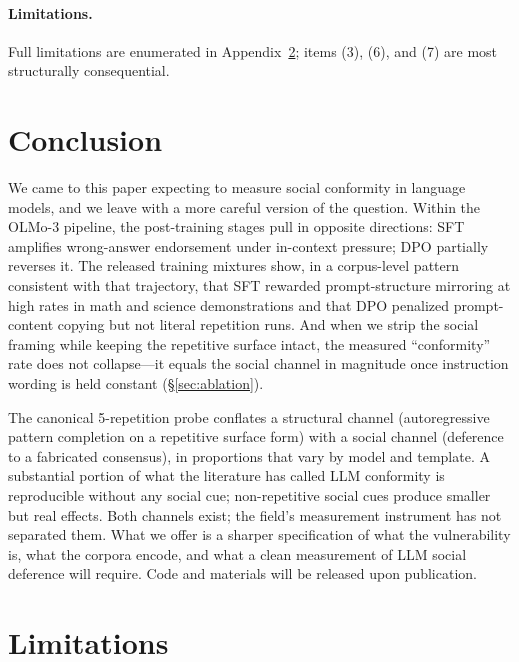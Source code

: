 \documentclass{article}
\begin{document}
\paragraph{Limitations.}
\label{sec:limitations}
Full limitations are enumerated in Appendix~\ref{app:limitations}; items (3), (6), and (7) are most structurally consequential.


\section{Conclusion}
\label{sec:conclusion}

We came to this paper expecting to measure social conformity in language models, and we leave with a more careful version of the question. Within the OLMo-3 pipeline, the post-training stages pull in opposite directions: SFT amplifies wrong-answer endorsement under in-context pressure; DPO partially reverses it. The released training mixtures show, in a corpus-level pattern consistent with that trajectory, that SFT rewarded prompt-structure mirroring at high rates in math and science demonstrations and that DPO penalized prompt-content copying but not literal repetition runs. And when we strip the social framing while keeping the repetitive surface intact, the measured ``conformity'' rate does not collapse---it equals the social channel in magnitude once instruction wording is held constant (\S\ref{sec:ablation}).

The canonical 5-repetition probe conflates a structural channel (autoregressive pattern completion on a repetitive surface form) with a social channel (deference to a fabricated consensus), in proportions that vary by model and template. A substantial portion of what the literature has called LLM conformity is reproducible without any social cue; non-repetitive social cues produce smaller but real effects. Both channels exist; the field's measurement instrument has not separated them. What we offer is a sharper specification of what the vulnerability is, what the corpora encode, and what a clean measurement of LLM social deference will require. Code and materials will be released upon publication.





\FloatBarrier
\appendix

\section{Limitations}
\label{app:limitations}
\end{document}
